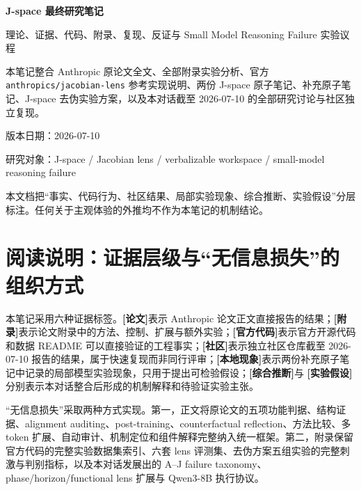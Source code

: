\documentclass[10.5pt,a4paper]{ctexart}
\newcommand{\Paper}{\textbf{[论文]}}
\newcommand{\AppendixTag}{\textbf{[附录]}}
\newcommand{\CodeTag}{\textbf{[官方代码]}}
\newcommand{\Community}{\textbf{[社区]}}
\newcommand{\Local}{\textbf{[本地现象]}}
\newcommand{\Infer}{\textbf{[综合推断]}}
\newcommand{\Hyp}{\textbf{[实验假设]}}
\begin{document}
\begin{titlepage}
\centering
\vspace*{2.4cm}
{\Huge\bfseries\sffamily\color{ink} J-space 最终研究笔记\par}
\vspace{0.45cm}
{\Large\sffamily 理论、证据、代码、附录、复现、反证与 Small Model Reasoning Failure 实验议程\par}
\vspace{1.4cm}
\begin{tcolorbox}[width=0.88\textwidth,colback=lightaccent,colframe=accent,arc=3mm,boxrule=0.8pt]
\centering
\large 本笔记整合 Anthropic 原论文全文、全部附录实验分析、官方 \texttt{anthropics/jacobian-lens} 参考实现说明、两份 J-space 原子笔记、补充原子笔记、J-space 去伪实验方案，以及本对话截至 2026-07-10 的全部研究讨论与社区独立复现。
\end{tcolorbox}
\vfill
{\large\sffamily 版本日期：2026-07-10\par}
\vspace{0.3cm}
{\normalsize\sffamily 研究对象：J-space / Jacobian lens / verbalizable workspace / small-model reasoning failure\par}
\vspace{1.8cm}
{\small 本文档把“事实、代码行为、社区结果、局部实验现象、综合推断、实验假设”分层标注。任何关于主观体验的外推均不作为本笔记的机制结论。\par}
\end{titlepage}

\tableofcontents
\clearpage

\section*{阅读说明：证据层级与“无信息损失”的组织方式}

本笔记采用六种证据标签。\Paper 表示 Anthropic 论文正文直接报告的结果；\AppendixTag 表示论文附录中的方法、控制、扩展与额外实验；\CodeTag 表示官方开源代码和数据 README 可以直接验证的工程事实；\Community 表示独立社区仓库截至 2026-07-10 报告的结果，属于快速复现而非同行评审；\Local 表示两份补充原子笔记中记录的局部模型实验现象，只用于提出可检验假设；\Infer 与 \Hyp 分别表示本对话整合后形成的机制解释和待验证实验主张。

“无信息损失”采取两种方式实现。第一，正文将原论文的五项功能判据、结构证据、alignment auditing、post-training、counterfactual reflection、方法比较、多 token 扩展、自动审计、机制定位和组件解释完整纳入统一框架。第二，附录保留官方代码的完整实验数据集索引、六套 lens 评测集、去伪方案五组实验的完整刺激与判别指标，以及本对话发展出的 A--J failure taxonomy、phase/horizon/functional lens 扩展与 Qwen3-8B 执行协议。
\end{document}
